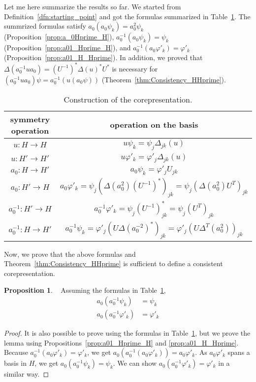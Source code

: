 \documentclass{article}
\theoremstyle{definition}
\newtheorem{prop}[dfn]{Proposition}
\begin{document}
Let me here summarize the results so far.
We started from Definition~\ref{dfn:starting_point} and got the formulas summarized in Table~\ref{table:operations_and_corep}.
The summrized formulas satisfy $a_0(a_0 \psi_k) = a_0^2 \psi_k$ (Proposition~\ref{prop:a_0Hprime_H}), 
$a_0^{-1} (a_0 \psi_k) = \psi_k$ (Proposition~\ref{prop:a01_Hprime_H}), and   $a_0^{-1} (a_0 \varphi'_k) = \varphi'_k$ (Proposition~\ref{prop:a01_H_Hprime}).
In addition, we proved that $\Delta(a_0^{-1} u a_0) = (U^{-1})^* \Delta(u)^* U^*$ is necessary for $(a_0^{-1} u a_0 ) \psi = a_0^{-1}(u (a_0 \psi))$ (Theorem~\ref{thm:Consistency_HHprime}).

\begin{table}[H]
  \label{table:operations_and_corep}
  \begin{center}
    \caption{Construction of the corepresentation.} 
\begin{tabular}{c|c}
  symmetry operation & operation on the basis \\
  \hline
  $u: H\to H$ & $u \psi_k = \psi_j \Delta_{jk} (u)$ \\
  $u: H'\to H'$ & $u \varphi'_k = \varphi'_j \Delta_{jk}(u)$ \\
  $a_0: H \to H'$ & $a_0 \psi_k = \varphi'_j U_{jk}$\\
  $a_0: H' \to H$ & $a_0 \varphi'_k = \psi_j (\Delta (a_0^2) (U^{-1})^*)_{jk} = \psi_j (\Delta (a_0^2) U^{T})_{jk}$\\
  $a_0^{-1}: H' \to H$ & $a_0^{-1} \varphi'_k = \psi_j (U^{-1})^*_{jk} = \psi_j (U^{T})_{jk}$\\
  $a_0^{-1}: H \to H'$ & $a_0^{-1} \psi_k = \varphi'_j (U \Delta(a_0^{-2})^*)_{jk} = \varphi'_j (U \Delta^T(a_0^{2}))_{jk}$
 \end{tabular}
\end{center}
\end{table}

Now, we prove that the above formulas and Theorem~\ref{thm:Consistency_HHprime} is sufficient to define a consistent corepresentation.

\begin{prop}\label{prop:a0a0m1_id}~
  Assuming the formulas in Table~\ref{table:operations_and_corep},
  \begin{align}
    a_0 (a_0^{-1} \psi_k) &= \psi_k
    \nonumber
    \\
    a_0 (a_0^{-1} \varphi'_k) &= \varphi'_k
  \end{align}
\end{prop}

\begin{proof}
  It is also possible to prove using the formulas in Table~\ref{table:operations_and_corep}, but we prove the lemma using Propositions~\ref{prop:a01_Hprime_H} and \ref{prop:a01_H_Hprime}.
  Because $a_0^{-1} (a_0 \varphi'_k) = \varphi'_k$, 
  we get $a_0 (a_0^{-1} (a_0 \varphi'_k)) = a_0 \varphi'_k$. As $ a_0 \varphi'_k$ spans a basis in $H$, we get $a_0 (a_0^{-1} \psi_k) = \psi_k$. We can show $ a_0 (a_0^{-1} \varphi'_k) = \varphi'_k$ in a similar way.
\end{proof}
\end{document}
